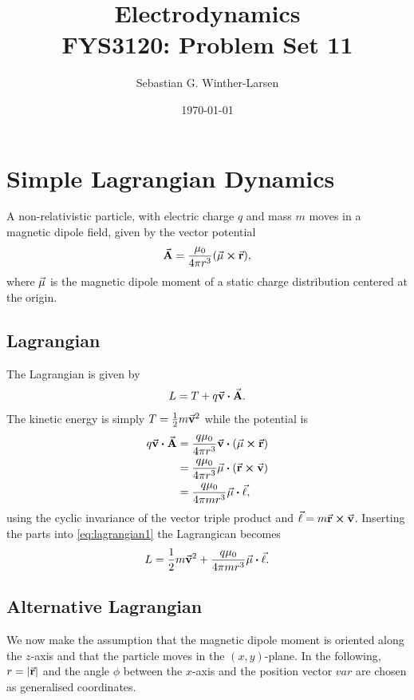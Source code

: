 \documentclass[11pt]{amsart}
\title[Electrodynamics]{Electrodynamics \\
	\hrulefill \small{ FYS3120: Problem Set 11 } \hrulefill}
\author[Winther-Larsen]{Sebastian G. Winther-Larsen}
\date{\today}
\begin{document}
\maketitle

\section{Simple Lagrangian Dynamics}

A non-relativistic particle, with electric charge $q$ and mass $m$ moves in a magnetic dipole field, given by the vector potential
\begin{equation}
\va{A} = \frac{\mu_0}{4\pi r^3}(\va{\mu} \cp \va{r}),
\end{equation}
where $\va{\mu}$ is the magnetic dipole moment of a static charge distribution centered at the origin.

\subsection{Lagrangian}
The Lagrangian is given by
\begin{equation}
\label{eq:lagrangian1}
L = T + q\va{v} \vdot \va{A}.
\end{equation}
The kinetic energy is simply $T = \frac{1}{2}m\va{v}^2$ while the potential is
\begin{align*}
q\va{v} \vdot \va{A} &= \frac{q\mu_0}{4\pi r^3}\va{v}\vdot(\va{\mu} \cp \va{r}) \\
					 &= \frac{q\mu_0}{4\pi r^3}\va{\mu}\vdot(\va{r}\cp\va{v}) \\
					 &= \frac{q\mu_0}{4\pi m r^3}\va{\mu}\vdot\va{\ell},
\end{align*}
using the cyclic invariance of the vector triple product and $\va{\ell} = m\va{r}\cp\va{v}$. Inserting the parts into \ref{eq:lagrangian1} the Lagrangican becomes
\begin{equation}
\label{eq:lagranrian2}
L = \frac{1}{2}m\va{v}^2 + \frac{q\mu_0}{4\pi m r^3}\va{\mu}\vdot\va{\ell}.
\end{equation}

\subsection{Alternative Lagrangian}
We now make the assumption that the magnetic dipole moment is oriented along the $z$-axis and that the particle moves in the $(x,y)$-plane. In the following, $r = \abs{\va{r}}$ and  the angle $\phi$ between the $x$-axis and the position vector $va{r}$ are chosen as generalised coordinates.
\end{document}
